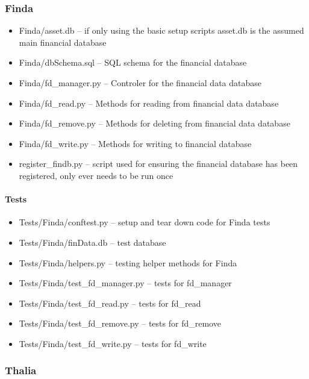 \documentclass[main.tex]{subfiles}
\begin{document}
\subsubsection{Finda}\label{finda}

\begin{itemize}

\item
  Finda/asset.db -- if only using the basic setup scripts asset.db is
  the assumed main financial database
\item
  Finda/dbSchema.sql -- SQL schema for the financial database
\item
  Finda/fd\_manager.py -- Controler for the financial data database
\item
  Finda/fd\_read.py -- Methods for reading from financial data database
\item
  Finda/fd\_remove.py -- Methods for deleting from financial data
  database
\item
  Finda/fd\_write.py -- Methods for writing to financial database
\item
  register\_findb.py -- script used for ensuring the financial database
  has been registered, only ever needs to be run once
\end{itemize}

\paragraph{Tests}\label{tests-2}

\begin{itemize}

\item
  Tests/Finda/conftest.py -- setup and tear down code for Finda tests
\item
  Tests/Finda/finData.db -- test database
\item
  Tests/Finda/helpers.py -- testing helper methods for Finda
\item
  Tests/Finda/test\_fd\_manager.py -- tests for fd\_manager
\item
  Tests/Finda/test\_fd\_read.py -- tests for fd\_read
\item
  Tests/Finda/test\_fd\_remove.py -- tests for fd\_remove
\item
  Tests/Finda/test\_fd\_write.py -- tests for fd\_write
\end{itemize}

\subsubsection{Thalia}\label{thalia}
\end{document}
